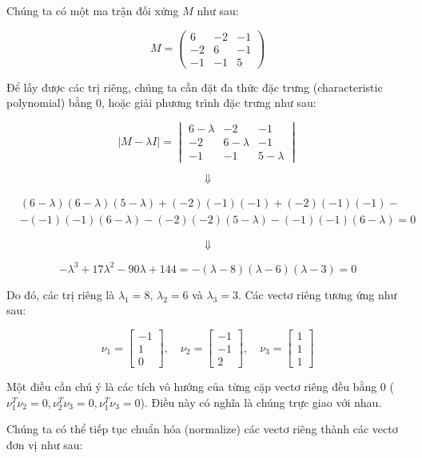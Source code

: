 Chúng ta có một ma trận đối xứng $M$ như sau:

\[M = \begin{pmatrix} 6 & -2 & -1 \\ -2 & 6 & -1 \\ -1 & -1 & 5 \end{pmatrix}\]

Để lấy được các trị riêng, chúng ta cần đặt đa thức đặc trưng (characteristic polynomial) bằng 0, hoặc giải phương trình đặc trưng như sau:

\[|M-\lambda I| = \begin{vmatrix} 6-\lambda & -2 & -1 \\ -2 & 6-\lambda & -1 \\ -1 & -1 & 5-\lambda \end{vmatrix}\]

\[\Downarrow \]

\begin{align*} &(6 - \lambda)(6 - \lambda)(5 - \lambda) + (-2)(-1)(-1) + (-2)(-1)(-1) - \\ &- (-1)(-1)(6-\lambda) - (-2)(-2)(5-\lambda) - (-1)(-1)(6-\lambda) = 0 \end{align*}

\[\Downarrow \]

\[-\lambda^{3} + 17 \lambda^{2} - 90 \lambda + 144 = -(\lambda-8)(\lambda-6)(\lambda-3) = 0\]

Do đó, các trị riêng là $\lambda_{1}=8$, $\lambda_{2}=6$ và $\lambda_{3}=3$. Các vectơ riêng tương ứng như sau:

\[\nu_{1}=\begin{bmatrix} -1 \\ 1\\ 0 \end{bmatrix}, \quad \nu_{2}=\begin{bmatrix} -1 \\ -1\\ 2 \end{bmatrix}, \quad \nu_{3}=\begin{bmatrix} 1 \\ 1\\ 1 \end{bmatrix}\]

Một điều cần chú ý là các tích vô hướng của từng cặp vectơ riêng đều bằng 0 ($\nu_{1}^{T}\nu_{2}=0,\nu_{2}^{T}\nu_{3}=0,\nu_{1}^{T}\nu_{3}=0$). Điều này có nghĩa là chúng trực giao với nhau.

Chúng ta có thể tiếp tục chuẩn hóa (normalize) các vectơ riêng thành các vectơ đơn vị như sau:

